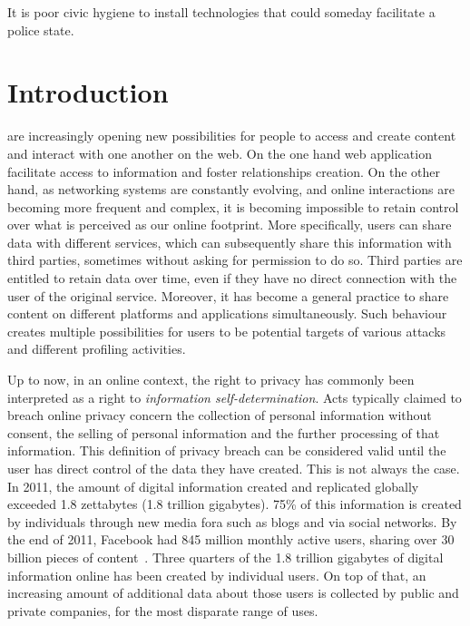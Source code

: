 \begin{savequote}[75mm] 
It is poor civic hygiene to install technologies that could someday facilitate a police state.
\end{savequote}

\chapter{Introduction}

 are increasingly opening new possibilities for people to access and create content and interact with one another on the web. On the one hand web application facilitate access to information and foster relationships creation. On the other hand, as networking systems are constantly evolving, and online interactions are becoming more frequent and complex, it is becoming impossible to retain control over what is perceived as our online footprint. More specifically, users can share data with different services, which can subsequently share this information with third parties, sometimes without asking for permission to do so. Third parties are entitled to retain data over time, even if they have no direct connection with the user of the original service. Moreover, it has become a general practice to share content on different platforms and applications simultaneously. Such behaviour creates multiple possibilities for users to be potential targets of various attacks and different profiling activities.

Up to now, in an online context, the right to privacy has commonly been interpreted as a right to \emph{information self-determination}. Acts typically claimed to breach online privacy concern the collection of personal information without consent, the selling of personal information and the further processing of that information. This definition of privacy breach can be considered valid until the user has direct control of the data they have created. This is not always the case. In 2011, the amount of digital information created and replicated globally exceeded 1.8 zettabytes (1.8 trillion gigabytes). 75\% of this information is created by individuals through new media fora such as blogs and via social networks. By the end of 2011, Facebook had 845 million monthly active users, sharing over 30 billion pieces of content~\cite{library-briefing}. Three quarters of the 1.8 trillion gigabytes of digital information online has been created by individual users. On top of that, an increasing amount of additional data about those users is collected by public and private companies, for the most disparate range of uses.

